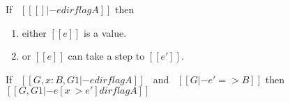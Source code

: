 \begin{lemma}[Progress]
\label{lemma:union:progress}
If \ $[[ [] |- e dirflag A]]$ then
 \begin{enumerate}
  \item either $[[e]]$ is a value.
  \item or $[[e]]$ can take a step to $[[e']]$.
  \end{enumerate}
\end{lemma}

\begin{lemma}[Substitution]
\label{lemma:union:substitution}
  If \ $[[G, x:B , G1 |- e dirflag A]]$ \ and \ $[[G |- e' => B]]$
  then \ $[[G, G1 |- e [ x ~> e' ] dirflag A]]$
\end{lemma}

\begin{comment}
\begin{proof}
By induction on typing relation.
  \begin{itemize}
    \item Cases \rref{typ-int, typ-var, typ-app, typ-sub, typ-abs} are trivial to prove.
    \item Case \rref{typ-anno} requires \cref{lemma:union:value-not-value}.
    \item Case \rref{typ-typeof} requires
    \cref{lemma:union:check-pexpr-ann,lemma:union:check-or-typ,lemma:union:pexpr-inf-typ}.
  \end{itemize}
\end{proof}

\begin{lemma}[Value Decidability]
\label{lemma:union:value-not-value}
$\forall$ $[[e]]$, \ value \ $[[e]]$ \ $\vee$ \ $\neg$ value \ $[[e]]$.
\end{lemma}

\begin{lemma}[check-or-typ]
\label{lemma:union:check-or-typ}
If \ $[[A *s B]]$ \ and \ $[[G |- p <= A \/ B]]$ \ then:
  \begin{enumerate}
    \item either \ $[[G |- p <= A]]$
    \item or \ $[[G |- p <= B]]$
  \end{enumerate}
\end{lemma}

\begin{lemma}[pexpr-inf-typ]
\label{lemma:union:pexpr-inf-typ}
If \ $[[G |- p <= A]]$ \ then:
  \begin{enumerate}
  \item $\exists$ $[[B]]$, \ $[[B <: A]]$
  \item and \ $[[G |- p => B]]$
  \end{enumerate}
\end{lemma}
\end{comment}

